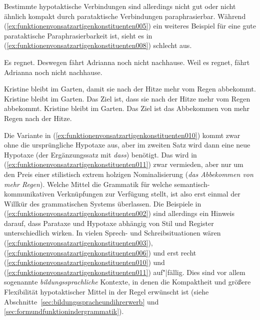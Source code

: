 Bestimmte hypotaktische Verbindungen sind allerdings nicht gut oder nicht ähnlich kompakt durch parataktische Verbindungen paraphrasierbar.
Während (\ref{ex:funktionenvonsatzartigenkonstituenten005}) ein weiteres Beispiel für eine gute parataktische Paraphrasierbarkeit ist, sieht es in (\ref{ex:funktionenvonsatzartigenkonstituenten008}) schlecht aus.

\begin{exe}
  \ex\label{ex:funktionenvonsatzartigenkonstituenten005}
  \begin{xlist}
    \ex\label{ex:funktionenvonsatzartigenkonstituenten006} Es regnet. Deswegen fährt Adrianna noch nicht nachhause.
    \ex\label{ex:funktionenvonsatzartigenkonstituenten007} Weil es regnet, fährt Adrianna noch nicht nachhause.
  \end{xlist}
  \ex\label{ex:funktionenvonsatzartigenkonstituenten008}
  \begin{xlist}
    \ex\label{ex:funktionenvonsatzartigenkonstituenten009} Kristine bleibt im Garten, damit sie nach der Hitze mehr vom Regen abbekommt.
    \ex\label{ex:funktionenvonsatzartigenkonstituenten010} Kristine bleibt im Garten. Das Ziel ist, dass sie nach der Hitze mehr vom Regen abbekommt.
    \ex\label{ex:funktionenvonsatzartigenkonstituenten011} Kristine bleibt im Garten. Das Ziel ist das Abbekommen von mehr Regen nach der Hitze.
  \end{xlist}
\end{exe}

Die Variante in (\ref{ex:funktionenvonsatzartigenkonstituenten010}) kommt zwar ohne die ursprüngliche Hypotaxe aus, aber im zweiten Satz wird dann eine neue Hypotaxe (der Ergänzungssatz mit \textit{dass}) benötigt.
Das wird in (\ref{ex:funktionenvonsatzartigenkonstituenten011}) zwar vermieden, aber nur um den Preis einer stilistisch extrem holzigen Nominalisierung (\textit{das Abbekommen von mehr Regen}).
Welche Mittel die Grammatik für welche semantisch-kommunikativen Verknüpfungen zur Verfügung stellt, ist also erst einmal der Willkür des grammatischen Systems überlassen.
Die Beispiele in (\ref{ex:funktionenvonsatzartigenkonstituenten002}) sind allerdings ein Hinweis darauf, dass Parataxe und Hypotaxe abhängig von Stil und Register unterschiedlich wirken.
In vielen Sprech- und Schreibsituationen wären (\ref{ex:funktionenvonsatzartigenkonstituenten003}), (\ref{ex:funktionenvonsatzartigenkonstituenten006}) und erst recht (\ref{ex:funktionenvonsatzartigenkonstituenten010}) und (\ref{ex:funktionenvonsatzartigenkonstituenten011}) auf"|fällig.
Dies sind vor allem sogenannte \textit{bildungssprachliche} Kontexte, in denen die Kompaktheit und größere Flexibilität hypotaktischer Mittel in der Regel erwünscht ist (siehe Abschnitte~\ref{sec:bildungsspracheundihrerwerb} und \ref{sec:formundfunktionindergrammatik}).

